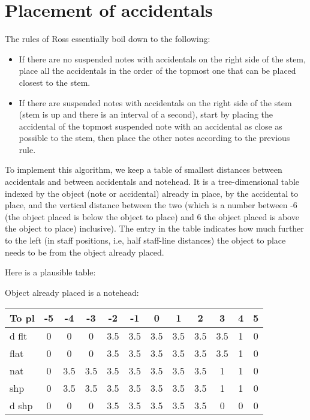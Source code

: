 \chapter{Placement of accidentals}

The rules of Ross essentially boil down to the following: 

\begin{itemize}
\item If there are no suspended notes with accidentals on the right
  side of the stem, place all the accidentals in the order of the
  topmost one that can be placed closest to the stem.
\item If there are suspended notes with accidentals on the right side
  of the stem (stem is up and there is an interval of a second), start
  by placing the accidental of the topmost suspended note with an
  accidental as close as possible to the stem, then place the other
  notes according to the previous rule.
\end{itemize}

To implement this algorithm, we keep a table of smallest distances
between accidentals and between accidentals and notehead.  It is a
tree-dimensional table indexed by the object (note or accidental)
already in place, by the accidental to place, and the vertical
distance between the two (which is a number between -6 (the object
placed is below the object to place) and 6 the object placed is above
the object to place) inclusive).  The entry in the table indicates how
much further to the left (in staff positions, i.e, half staff-line
distances) the object to place needs to be from the object already
placed.

Here is a plausible table:

Object already placed is a notehead:

{\small\begin{tabular}{|l|c|c|c|c|c|c|c|c|c|c|c|}
\hline
 To pl &  -5 &  -4 &  -3 &  -2 &  -1 &   0 &   1 &   2 &   3 &   4 &   5\\
\hline
 d flt &   0 &   0 &   0 & 3.5 & 3.5 & 3.5 & 3.5 & 3.5 & 3.5 &   1 &   0\\
\hline
  flat &   0 &   0 &   0 & 3.5 & 3.5 & 3.5 & 3.5 & 3.5 & 3.5 &   1 &   0\\
\hline
   nat &   0 & 3.5 & 3.5 & 3.5 & 3.5 & 3.5 & 3.5 & 3.5 &   1 &   1 &   0\\
\hline
   shp &   0 & 3.5 & 3.5 & 3.5 & 3.5 & 3.5 & 3.5 & 3.5 &   1 &   1 &   0\\
\hline
 d shp &   0 &   0 &   0 & 3.5 & 3.5 & 3.5 & 3.5 & 3.5 &   0 &   0 &   0\\
\hline
\end{tabular}}

